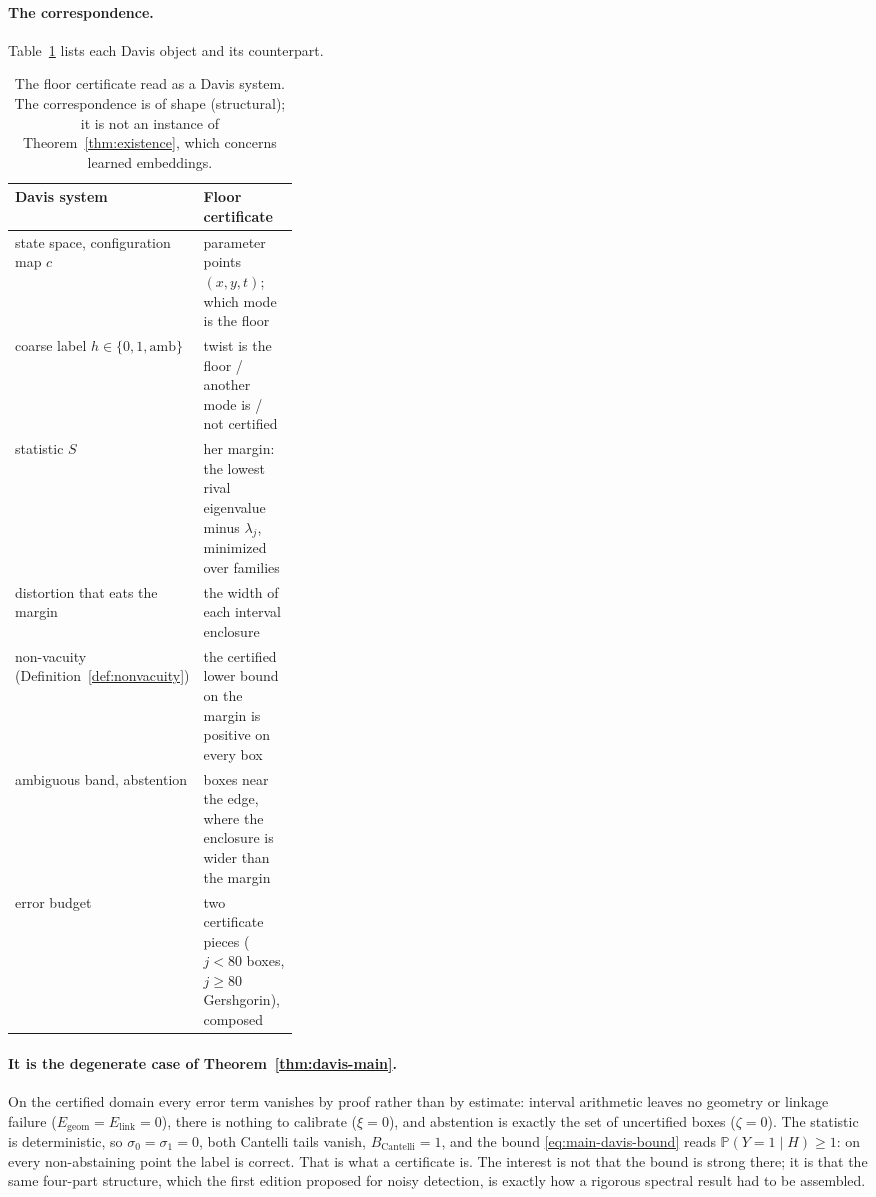\documentclass[11pt]{article}
\newcommand{\Prob}{\mathbb{P}}
\theoremstyle{remark}
\theoremstyle{plain}
\begin{document}
\paragraph{The correspondence.}
Table~\ref{tab:exact-instance} lists each Davis object and its counterpart.

\begin{table}[H]
\centering
\caption{The floor certificate read as a Davis system. The correspondence is of shape (structural); it is not
an instance of Theorem~\ref{thm:existence}, which concerns learned embeddings.}
\label{tab:exact-instance}
\begin{tabularx}{\linewidth}{@{}p{0.33\linewidth}X@{}}
\toprule
\textbf{Davis system} & \textbf{Floor certificate} \\
\midrule
state space, configuration map $c$ & parameter points $(x,y,t)$; which mode is the floor \\
coarse label $h \in \{0,1,\mathrm{amb}\}$ & twist is the floor / another mode is / not certified \\
statistic $S$ & her margin: the lowest rival eigenvalue minus $\lambda_j$, minimized over families \\
distortion that eats the margin & the width of each interval enclosure \\
non-vacuity (Definition~\ref{def:nonvacuity}) & the certified lower bound on the margin is positive on every box \\
ambiguous band, abstention & boxes near the edge, where the enclosure is wider than the margin \\
error budget & two certificate pieces ($j<80$ boxes, $j\ge80$ Gershgorin), composed \\
\bottomrule
\end{tabularx}
\end{table}

\paragraph{It is the degenerate case of Theorem~\ref{thm:davis-main}.}
On the certified domain every error term vanishes by proof rather than by estimate: interval arithmetic
leaves no geometry or linkage failure ($E_{\mathrm{geom}} = E_{\mathrm{link}} = 0$), there is nothing to calibrate
($\xi = 0$), and abstention is exactly the set of uncertified boxes ($\zeta = 0$). The statistic is deterministic,
so $\sigma_0 = \sigma_1 = 0$, both Cantelli tails vanish, $B_{\mathrm{Cantelli}} = 1$, and the bound
\eqref{eq:main-davis-bound} reads $\Prob(Y = 1 \mid H) \ge 1$: on every non-abstaining point the label is
correct. That is what a certificate is. The interest is not that the bound is strong there; it is that the
same four-part structure, which the first edition proposed for noisy detection, is exactly how a rigorous
spectral result had to be assembled.
\end{document}
